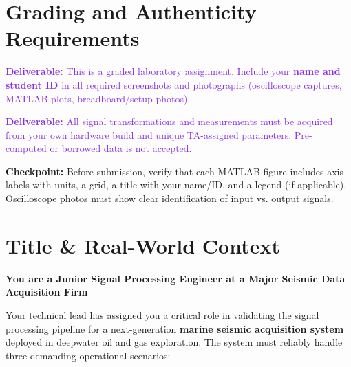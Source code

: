\documentclass[11pt,letterpaper]{article}
\providecommand{\cpECE}[1]{\textcolor{OliveGreen}{\textbf{Checkpoint:} #1}}
\providecommand{\delECE}[1]{\textcolor{BlueViolet}{\textbf{Deliverable:} #1}}
\begin{document}
\clearpage

\section*{Grading and Authenticity Requirements}
\delECE{This is a graded laboratory assignment. Include your \textbf{name and student ID} in all required screenshots and photographs (oscilloscope captures, MATLAB plots, breadboard/setup photos).}

\delECE{All signal transformations and measurements must be acquired from your own hardware build and unique TA-assigned parameters. Pre-computed or borrowed data is not accepted.}

\cpECE{Before submission, verify that each MATLAB figure includes axis labels with units, a grid, a title with your name/ID, and a legend (if applicable). Oscilloscope photos must show clear identification of input vs. output signals.}

\clearpage

\section*{Title \& Real-World Context}

\noindent
\textbf{\large You are a Junior Signal Processing Engineer at a Major Seismic Data Acquisition Firm}

\noindent
Your technical lead has assigned you a critical role in validating the signal processing pipeline for a next-generation \textbf{marine seismic acquisition system} deployed in deepwater oil and gas exploration. The system must reliably handle three demanding operational scenarios:
\end{document}
